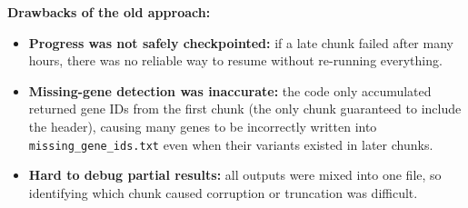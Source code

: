 \documentclass[11pt]{article}
\begin{document}
	\textbf{Drawbacks of the old approach:}
	\begin{itemize}
		\item \textbf{Progress was not safely checkpointed:} if a late chunk failed after many hours, there was no reliable way to resume without re-running everything.
		\item \textbf{Missing-gene detection was inaccurate:} the code only accumulated returned gene IDs from the first chunk (the only chunk guaranteed to include the header), causing many genes to be incorrectly written into \texttt{missing\_gene\_ids.txt} even when their variants existed in later chunks.
		\item \textbf{Hard to debug partial results:} all outputs were mixed into one file, so identifying which chunk caused corruption or truncation was difficult.
	\end{itemize}
	
\end{document}
